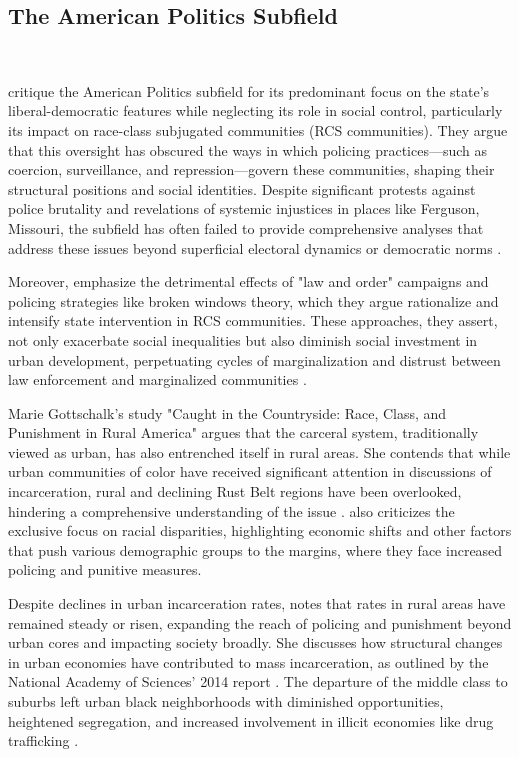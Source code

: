 \documentclass[12pt]{article}
\begin{document}
\subsection{The American Politics Subfield}\

\textcite{sossPoliceAreOur2017} critique the American Politics subfield for its predominant focus on the state's liberal-democratic features while neglecting its role in social control, particularly its impact on race-class subjugated communities (RCS communities). They argue that this oversight has obscured the ways in which policing practices—such as coercion, surveillance, and repression—govern these communities, shaping their structural positions and social identities. Despite significant protests against police brutality and revelations of systemic injustices in places like Ferguson, Missouri, the subfield has often failed to provide comprehensive analyses that address these issues beyond superficial electoral dynamics or democratic norms \parencite[565--566]{sossPoliceAreOur2017}.

Moreover, \textcite{sossPoliceAreOur2017} emphasize the detrimental effects of "law and order" campaigns and policing strategies like broken windows theory, which they argue rationalize and intensify state intervention in RCS communities. These approaches, they assert, not only exacerbate social inequalities but also diminish social investment in urban development, perpetuating cycles of marginalization and distrust between law enforcement and marginalized communities \parencite[569--571]{sossPoliceAreOur2017}.

Marie Gottschalk's \parencite*{gottschalkCaughtCountrysideRace2020} study "Caught in the Countryside: Race, Class, and Punishment in Rural America" argues that the carceral system, traditionally viewed as urban, has also entrenched itself in rural areas. She contends that while urban communities of color have received significant attention in discussions of incarceration, rural and declining Rust Belt regions have been overlooked, hindering a comprehensive understanding of the issue \parencite{gottschalkCaughtCountrysideRace2020}. \textcite{gottschalkCaughtCountrysideRace2020} also criticizes the exclusive focus on racial disparities, highlighting economic shifts and other factors that push various demographic groups to the margins, where they face increased policing and punitive measures.

Despite declines in urban incarceration rates, \textcite{gottschalkCaughtCountrysideRace2020} notes that rates in rural areas have remained steady or risen, expanding the reach of policing and punishment beyond urban cores and impacting society broadly. She discusses how structural changes in urban economies have contributed to mass incarceration, as outlined by the National Academy of Sciences' 2014 report \parencites[35]{gottschalkCaughtCountrysideRace2020}{travisGrowthIncarcerationUnited2014}. The departure of the middle class to suburbs left urban black neighborhoods with diminished opportunities, heightened segregation, and increased involvement in illicit economies like drug trafficking \parencites{gottschalkCaughtCountrysideRace2020}{travisGrowthIncarcerationUnited2014}.
\end{document}
